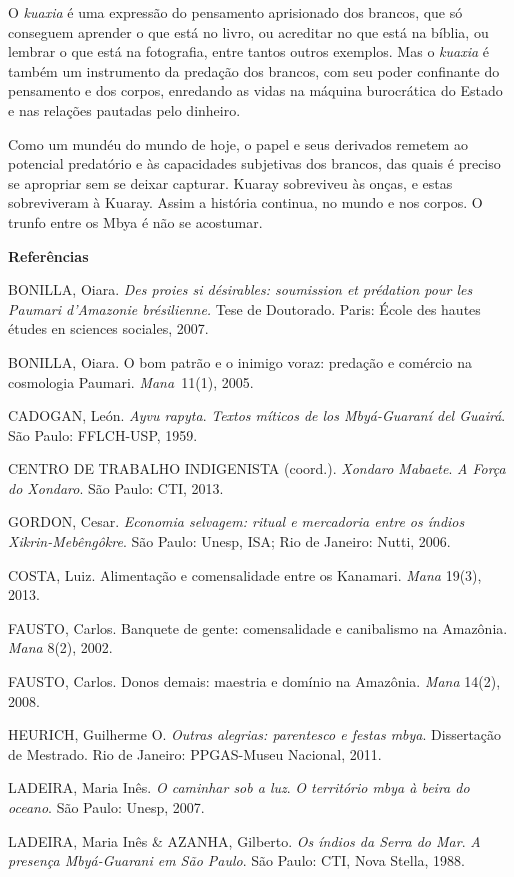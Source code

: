O \emph{kuaxia} é uma expressão do pensamento aprisionado dos brancos,
que só conseguem aprender o que está no livro, ou acreditar no que está
na bíblia, ou lembrar o que está na fotografia, entre tantos outros
exemplos. Mas o \emph{kuaxia} é também um instrumento da predação dos
brancos, com seu poder confinante do pensamento e dos corpos, enredando
as vidas na máquina burocrática do Estado e nas relações pautadas pelo
dinheiro.

Como um mundéu do mundo de hoje, o papel e seus derivados remetem ao
potencial predatório e às capacidades subjetivas dos brancos, das quais
é preciso se apropriar sem se deixar capturar. Kuaray sobreviveu às
onças, e estas sobreviveram à Kuaray. Assim a história continua, no
mundo e nos corpos. O trunfo entre os Mbya é não se acostumar.

\textbf{Referências }

BONILLA, Oiara. \emph{Des proies si désirables: soumission et prédation
pour les Paumari d'Amazonie brésilienne.} Tese de Doutorado. Paris:
École des hautes études en sciences sociales, 2007.

BONILLA, Oiara. O bom patrão e o inimigo voraz: predação e comércio na
cosmologia Paumari. \emph{Mana~}11(1), 2005.

CADOGAN, León. \emph{Ayvu rapyta}. \emph{Textos míticos de los
Mbyá-Guaraní del Guairá}. São Paulo: FFLCH-USP, 1959.

CENTRO DE TRABALHO INDIGENISTA (coord.). \emph{Xondaro Mabaete}. \emph{A
Força do Xondaro}. São Paulo: CTI, 2013.

GORDON, Cesar. \emph{Economia selvagem: ritual e mercadoria entre os
índios Xikrin-Mebêngôkre}. São Paulo: Unesp, ISA; Rio de Janeiro: Nutti,
2006.

COSTA, Luiz. Alimentação e comensalidade entre os Kanamari. \emph{Mana}
19(3), 2013.

FAUSTO, Carlos. Banquete de gente: comensalidade e canibalismo na
Amazônia. \emph{Mana} 8(2), 2002.

FAUSTO, Carlos. Donos demais: maestria e domínio na Amazônia.
\emph{Mana} 14(2), 2008.

HEURICH, Guilherme O. \emph{Outras alegrias: parentesco e festas mbya}.
Dissertação de Mestrado. Rio de Janeiro: PPGAS-Museu Nacional, 2011.

LADEIRA, Maria Inês. \emph{O caminhar sob a luz}. \emph{O território
mbya à beira do oceano}. São Paulo: Unesp, 2007.

LADEIRA, Maria Inês \& AZANHA, Gilberto. \emph{Os índios da Serra do
Mar}. \emph{A presença Mbyá-Guarani em São Paulo}. São Paulo: CTI, Nova
Stella, 1988.

